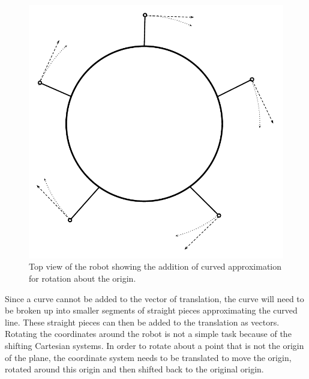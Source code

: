 \FloatBarrier
\begin{figure}[h]
\centering
\includegraphics[scale = 1]{pics/Body_Layout_5.pdf}
\caption{Top view of the robot showing the addition of curved approximation for rotation about the origin.}
\label{fig:Body_layout_5}
\end{figure}
\FloatBarrier

Since a curve cannot be added to  the vector of translation, the curve will need to be broken up into smaller segments of straight pieces approximating the curved line. These straight pieces can then be added to the translation as vectors. Rotating the coordinates around the robot is not a simple task because of the shifting Cartesian systems. In order to rotate about a point that is not the origin of the plane, the coordinate system needs to be translated to move the origin, rotated around this origin and then shifted back to the original origin.

